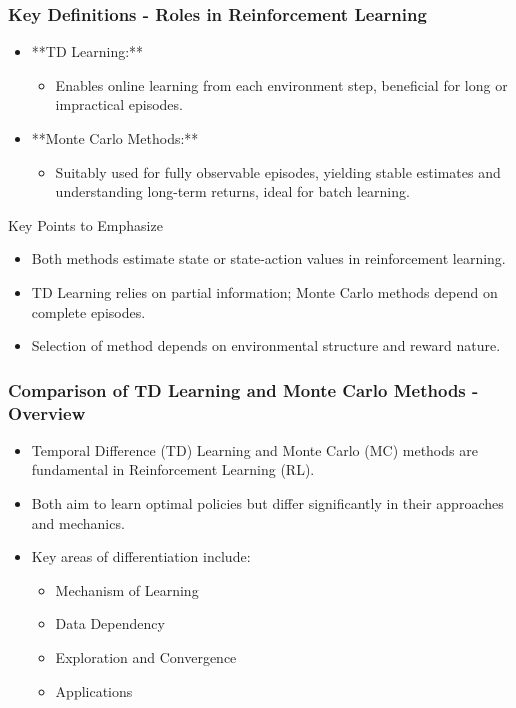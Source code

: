 \documentclass[aspectratio=169]{beamer}
\begin{document}
\begin{frame}[fragile]
    \frametitle{Key Definitions - Roles in Reinforcement Learning}
    \begin{itemize}
        \item **TD Learning:**
            \begin{itemize}
                \item Enables online learning from each environment step, beneficial for long or impractical episodes.
            \end{itemize}

        \item **Monte Carlo Methods:**
            \begin{itemize}
                \item Suitably used for fully observable episodes, yielding stable estimates and understanding long-term returns, ideal for batch learning.
            \end{itemize}
    \end{itemize}

    \begin{block}{Key Points to Emphasize}
        \begin{itemize}
            \item Both methods estimate state or state-action values in reinforcement learning.
            \item TD Learning relies on partial information; Monte Carlo methods depend on complete episodes.
            \item Selection of method depends on environmental structure and reward nature.
        \end{itemize}
    \end{block}
\end{frame}

\begin{frame}[fragile]
    \frametitle{Comparison of TD Learning and Monte Carlo Methods - Overview}
    \begin{itemize}
        \item Temporal Difference (TD) Learning and Monte Carlo (MC) methods are fundamental in Reinforcement Learning (RL).
        \item Both aim to learn optimal policies but differ significantly in their approaches and mechanics.
        \item Key areas of differentiation include:
        \begin{itemize}
            \item Mechanism of Learning
            \item Data Dependency
            \item Exploration and Convergence
            \item Applications
        \end{itemize}
    \end{itemize}
\end{frame}
\end{document}
